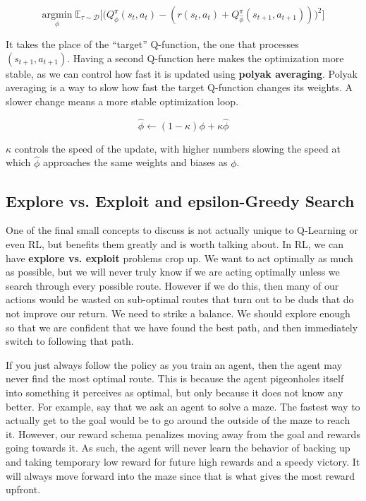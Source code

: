     $$\underset{\phi}{\mathrm{argmin}}\;\mathbb{E}_{\tau \sim \mathcal{D}}\biggl[\biggl(Q_\phi^\pi(s_t, a_t) - (r(s_t, a_t) + Q_{\hat{\phi}}^\pi(s_{t+1}, a_{t+1}))\biggr)^2\biggr]$$

    It takes the place of the ``target'' Q-function, the one that processes $(s_{t+1}, a_{t+1})$. Having a second Q-function here makes the optimization more stable, as we can control how fast it is updated using \textbf{polyak averaging}. Polyak averaging is a way to slow how fast the target Q-function changes its weights. A slower change means a more stable optimization loop.

    $$\hat{\phi} \leftarrow (1-\kappa)\phi + \kappa\hat{\phi}$$

    $\kappa$ controls the speed of the update, with higher numbers slowing the speed at which $\hat{\phi}$ approaches the same weights and biases as $\phi$.
\subsection{Explore vs. Exploit and epsilon-Greedy Search}
    \large One of the final small concepts to discuss is not actually unique to Q-Learning or even RL, but benefits them greatly and is worth talking about. In RL, we can have \textbf{explore vs. exploit} problems crop up. We want to act optimally as much as possible, but we will never truly know if we are acting optimally unless we search through every possible route. However if we do this, then many of our actions would be wasted on sub-optimal routes that turn out to be duds that do not improve our return. We need to strike a balance. We should explore enough so that we are confident that we have found the best path, and then immediately switch to following that path. 

    If you just always follow the policy as you train an agent, then the agent may never find the most optimal route. This is because the agent pigeonholes itself into something it perceives as optimal, but only because it does not know any better. For example, say that we ask an agent to solve a maze. The fastest way to actually get to the goal would be to go around the outside of the maze to reach it. However, our reward schema penalizes moving away from the goal and rewards going towards it. As such, the agent will never learn the behavior of backing up and taking temporary low reward for future high rewards and a speedy victory. It will always move forward into the maze since that is what gives the most reward upfront. 

